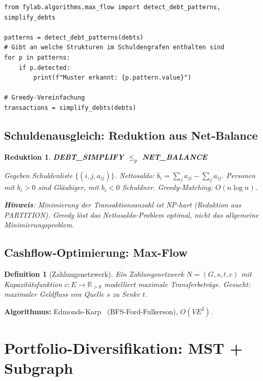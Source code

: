 \documentclass[a4paper,12pt]{article}
\newtheorem{definition}{Definition}
\newtheorem{reduktion}{Reduktion}
\begin{document}
\begin{lstlisting}[caption=Schuldenstruktur-Analyse via Subgraph]
from fylab.algorithms.max_flow import detect_debt_patterns, simplify_debts

patterns = detect_debt_patterns(debts)
# Gibt an welche Strukturen im Schuldengrafen enthalten sind
for p in patterns:
    if p.detected:
        print(f"Muster erkannt: {p.pattern.value}")

# Greedy-Vereinfachung
transactions = simplify_debts(debts)
\end{lstlisting}

\subsection{Schuldenausgleich: Reduktion aus Net-Balance}

\begin{reduktion}
    \textbf{DEBT\_SIMPLIFY $\leq_p$ NET\_BALANCE}

    Gegeben Schuldenliste $\{(i,j,a_{ij})\}$. Nettosaldo:
    $b_i = \sum_j a_{ji} - \sum_j a_{ij}$.
    Personen mit $b_i > 0$ sind Gläubiger, mit $b_i < 0$ Schuldner.
    Greedy-Matching: $O(n \log n)$.

    \textbf{Hinweis}: Minimierung der Transaktionsanzahl ist NP-hart
    (Reduktion aus PARTITION). Greedy löst das Nettosaldo-Problem optimal,
    nicht das allgemeine Minimierungsproblem.
\end{reduktion}

\subsection{Cashflow-Optimierung: Max-Flow}

\begin{definition}[Zahlungsnetzwerk]
    Ein Zahlungsnetzwerk $N = (G, s, t, c)$ mit Kapazitätsfunktion
    $c: E \to \mathbb{R}_{>0}$ modelliert maximale Transferbeträge.
    Gesucht: maximaler Geldfluss von Quelle $s$ zu Senke $t$.
\end{definition}

\textbf{Algorithmus:} Edmonds-Karp~\cite{edmonds1972, cormen2022} (BFS-Ford-Fulkerson), $O(VE^2)$.

\section{Portfolio-Diversifikation: MST + Subgraph}
\label{sec:mst}
\end{document}
